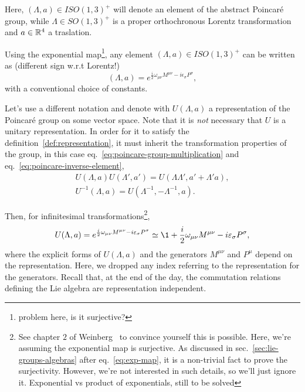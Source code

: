 Here, $(\Lambda,a) \in ISO(1,3)^+$ will denote an element of the abstract Poincaré group, while $\Lambda \in SO(1,3)^+$ is a proper orthochronous Lorentz transformation and $a \in \mathbb{R}^4$ a traslation.

Using the exponential map\footnote{\color{red}problem here, is it surjective?\color{black}}, any element $(\Lambda,a) \in ISO(1,3)^+$ can be written as \color{red}(different sign w.r.t Lorentz!)\color{black}
\begin{equation}
    (\Lambda,a) = e^{\frac{i}{2} \omega_{\mu\nu} M^{\mu\nu} - i \epsilon_\sigma P^\sigma},
\end{equation}
with a conventional choice of constants.



Let's use a different notation and denote with $U(\Lambda, a)$ a representation of the Poincaré group on some vector space. Note that it is \emph{not} necessary that $U$ is a unitary representation. In order for it to satisfy the definition~\ref{def:representation}, it must inherit the transformation properties of the group, in this case eq.~\eqref{eq:poincare-group-multiplication} and eq.~\eqref{eq:poincare-inverse-element},
\begin{subequations}
\begin{gather}
    U(\Lambda, a) U(\Lambda',a') = U(\Lambda\Lambda', a' + \Lambda' a) , \label{eq:representation-poincare-group-multiplication} \\
    U^{-1} (\Lambda, a) = U(\Lambda^{-1},-\Lambda^{-1},a) . \label{eq:representation-poincare-inverse-element}
\end{gather}
\end{subequations}

Then, for infinitesimal transformations\footnote{See chapter $2$ of Weinberg~\cite{weinberg} to convince yourself this is possible. Here, we're assuming the exponential map is surjective. As discussed in sec.~\ref{sec:lie-groups-algebras} after eq.~\eqref{eq:exp-map}, it is a non-trivial fact to prove the surjectivity. However, we're not interested in such details, so we'll just ignore it. \color{red} Exponential vs product of exponentials, still to be solved \color{black}},
\begin{equation}\label{eq:infinitesimal-poicare-transformation}
    U(\Lambda, a) = e^{\frac{i}{2} \omega_{\mu\nu} M^{\mu\nu} - i \epsilon_\sigma P^\sigma} \simeq \1 + \frac{i}{2} \omega_{\mu\nu} M^{\mu\nu} - i \epsilon_\sigma P^\sigma,
\end{equation}
where the explicit forms of $U(\Lambda,a)$ and the generators $M^{\mu\nu}$ and $P^\mu$ depend on the representation. Here, we dropped any index referring to the representation for the generators. Recall that, at the end of the day, the commutation relations defining the Lie algebra are representation independent.


